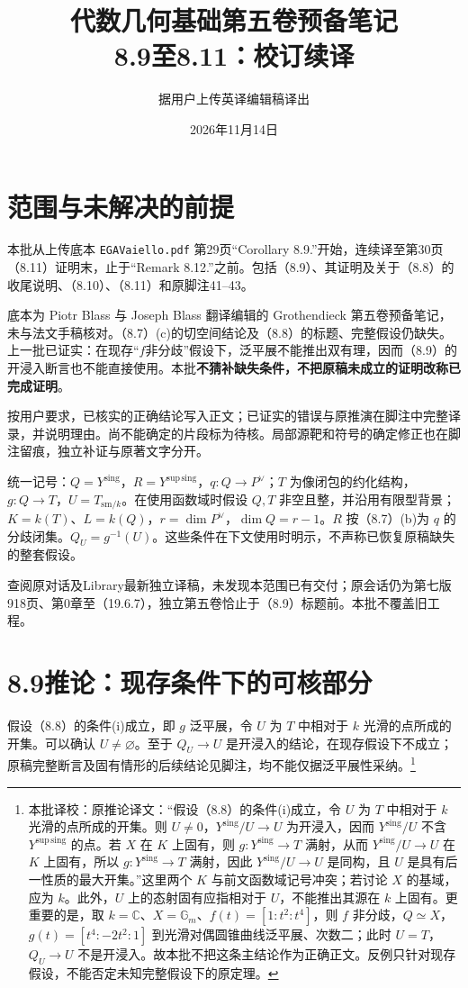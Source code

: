 \documentclass{ctexbook}
\title{代数几何基础第五卷预备笔记\\8.9至8.11：校订续译}
\author{据用户上传英译编辑稿译出}
\date{2026年11月14日}
\newcommand{\corr}[1]{\footnote{本批译校：#1}}
\newcommand{\Ys}{Y^{\mathrm{sing}}}
\newcommand{\Yss}{Y^{\mathrm{sup\,sing}}}
\begin{document}
\maketitle
\frontmatter
\chapter*{范围与未解决的前提}
本批从上传底本 \texttt{EGAVaiello.pdf} 第29页“Corollary 8.9.”开始，连续译至第30页（8.11）证明末，止于“Remark 8.12.”之前。包括（8.9）、其证明及关于（8.8）的收尾说明、（8.10）、（8.11）和原脚注41--43。

底本为 Piotr Blass 与 Joseph Blass 翻译编辑的 Grothendieck 第五卷预备笔记，未与法文手稿核对。（8.7）(c)的切空间结论及（8.8）的标题、完整假设仍缺失。上一批已证实：在现存“$f$非分歧”假设下，泛平展不能推出双有理，因而（8.9）的开浸入断言也不能直接使用。本批\textbf{不猜补缺失条件，不把原稿未成立的证明改称已完成证明}。

按用户要求，已核实的正确结论写入正文；已证实的错误与原推演在脚注中完整译录，并说明理由。尚不能确定的片段标为待核。局部源靶和符号的确定修正也在脚注留痕，独立补证与原著文字分开。

统一记号：$Q=\Ys$，$R=\Yss$，$q:Q\to P^\vee$；$T$ 为像闭包的约化结构，$g:Q\to T$，$U=T_{\mathrm{sm}/k}$。在使用函数域时假设 $Q,T$ 非空且整，并沿用有限型背景；$K=k(T)$、$L=k(Q)$，$r=\dim P^\vee$，$\dim Q=r-1$。$R$ 按（8.7）(b)为 $q$ 的分歧闭集。$Q_U=g^{-1}(U)$。这些条件在下文使用时明示，不声称已恢复原稿缺失的整套假设。

查阅原对话及Library最新独立译稿，未发现本范围已有交付；原会话仍为第七版918页、第0章至（19.6.7），独立第五卷恰止于（8.9）标题前。本批不覆盖旧工程。
\mainmatter
\chapter*{8.9\quad 推论：现存条件下的可核部分}
假设（8.8）的条件(i)成立，即 $g$ 泛平展，令 $U$ 为 $T$ 中相对于 $k$ 光滑的点所成的开集。可以确认 $U\ne\varnothing$。至于 $Q_U\to U$ 是开浸入的结论，在现存假设下不成立；原稿完整断言及固有情形的后续结论见脚注，均不能仅据泛平展性采纳。\corr{原推论译文：“假设（8.8）的条件(i)成立，令 $U$ 为 $T$ 中相对于 $k$ 光滑的点所成的开集。则 $U\ne0$，$\Ys/U\to U$ 为开浸入，因而 $\Ys/U$ 不含 $\Yss$ 的点。若 $X$ 在 $K$ 上固有，则 $g:\Ys\to T$ 满射，从而 $\Ys/U\to U$ 在 $K$ 上固有，所以 $g:\Ys\to T$ 满射，因此 $\Ys/U\to U$ 是同构，且 $U$ 是具有后一性质的最大开集。”这里两个 $K$ 与前文函数域记号冲突；若讨论 $X$ 的基域，应为 $k$。此外，$U$ 上的态射固有应指相对于 $U$，不能推出其源在 $k$ 上固有。更重要的是，取 $k=\mathbb C$、$X=\mathbb G_m$、$f(t)=[1:t^2:t^4]$，则 $f$ 非分歧，$Q\simeq X$，$g(t)=[t^4:-2t^2:1]$ 到光滑对偶圆锥曲线泛平展、次数二；此时 $U=T$，$Q_U\to U$ 不是开浸入。故本批不把这条主结论作为正确正文。反例只针对现存假设，不能否定未知完整假设下的原定理。}
\end{document}
